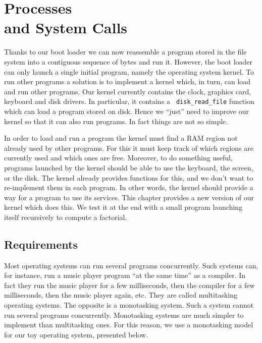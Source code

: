 
\renewcommand{\rustfile}{chapter3}
\setcounter{rustid}{0}


\chapter[Processes and System Calls]{Processes\\and System
Calls}\label{chapter:processes}

Thanks to our boot loader we can now reassemble a program stored in the file
system into a contiguous sequence of bytes and run it. However, the boot loader
can only launch a single initial program, namely the operating system kernel.
To run other programs a solution is to implement a kernel which, in turn, can
load and run other programs. Our kernel currently contains the clock, graphics
card, keyboard and disk drivers. In particular, it contains a {\tt
disk\_read\_file} function which can load a program stored on disk. Hence we
``just'' need to improve our kernel so that it can also run programs. In fact
things are not so simple.

In order to load and run a program the kernel must find a RAM region not
already used by other programs. For this it must keep track of which regions
are currently used and which ones are free. Moreover, to do something useful,
programs launched by the kernel should be able to use the keyboard, the screen,
or the disk. The kernel already provides functions for this, and we don't want
to re-implement them in each program. In other words, the kernel should provide
a way for a program to use its services. This chapter provides a new version of
our kernel which does this. We test it at the end with a small program
launching itself recursively to compute a factorial.

\section{Requirements}

Most operating systems can run several programs concurrently. Such systems can,
for instance, run a music player program ``at the same time'' as a compiler. In
fact they run the music player for a few milliseconds, then the compiler for a
few milliseconds, then the music player again, etc. They are called
multitasking operating systems. The opposite is a monotasking system. Such a
system cannot run several programs concurrently. Monotasking systems are much
simpler to implement than multitasking ones. For this reason, we use a
monotasking model for our toy operating system, presented below.

